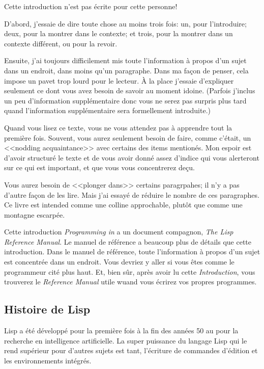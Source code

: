 Cette introduction n'est pas écrite pour cette personne!

D'abord, j'essaie de dire toute chose au moins trois fois: un, pour
l'introduire; deux, pour la montrer dans le contexte; et trois, pour
la montrer dans un contexte différent, ou pour la revoir.

Ensuite, j'ai toujours difficilement mis toute l'information à propos
d'un sujet  dans un endroit, dans moins qu'un paragraphe. Dans ma
façon de penser, cela impose un pavet trop lourd pour le lecteur. \`A
la place j'essaie d'expliquer seulement ce dont vous avez besoin de
savoir au moment idoine. (Parfois j'inclus un peu d'information
supplémentaire donc vous ne serez pas surpris plus tard quand
l'information supplémentaire sera formellement introduite.)

Quand vous lisez ce texte, vous ne vous attendez pas à apprendre tout
la première fois. Souvent, vous aurez seulement besoin de faire, comme
c'était, un <<nodding acquaintance>> avec certains des items
mentionés. Mon espoir est d'avoir structuré le texte et de vous avoir
donné assez d'indice qui vous alerteront sur ce qui est important, et
que vous vous concentrerez deçu.

Vous aurez besoin de <<plonger dans>> certains paragrpahes; il n'y a
pas d'autre façon de les lire. Mais j'ai essayé de réduire le nombre
de ces paragraphes. Ce livre est intended comme une colline
approchable, plutôt que comme une montagne escarpée.

Cette introduction \textit{Programming in \el} a un document
compagnon, \textit{The \gnue Lisp Reference Manual}. Le manuel de
référence a beaucoup plus de détails que cette introduction. Dans le
manuel de référence, toute l'information à propos d'un sujet est
concentrée dans un endroit. Vous devriez y aller si vous êtes comme le
programmeur cité plus haut. Et, bien sûr, après avoir lu cette
\textit{Introduction}, vous trouverez le \textit{Reference Manual}
utile wuand vous écrirez vos propres programmes.

\subsection*{Histoire de Lisp}

Lisp a été développé pour la première fois à la fin des années 50 au
\MIT pour la recherche en intelligence artificielle. La super
puissance du langage Lisp qui le rend supérieur pour d'autres sujets
est tant, l'écriture de commandes d'édition et les environnements
intégrés.

